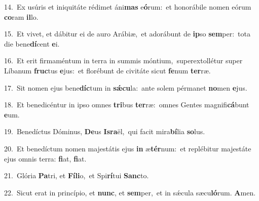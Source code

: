 {\numbfont\textcolor{\numbcolor}{14.}}~Ex usúris et iniquitáte rédimet áni\textbf{mas} e\-\textbf{ó}\-rum:~\star et honorábile nomen eórum \textbf{co}\-ram \textbf{il}\-lo.\par
{\numbfont\textcolor{\numbcolor}{15.}}~Et vivet, et dábitur ei de auro Arábiæ,~\dagger et adorábunt de \textbf{ip}\-so \textbf{sem}\-per:~\star tota die bene\-\textbf{dí}\-cent \textbf{e}\-i.\par
{\numbfont\textcolor{\numbcolor}{16.}}~Et erit firmaméntum in terra in summis móntium,~\dagger superextollétur super Líbanum \textbf{fruc}\-tus \textbf{e}\-jus:~\star et florébunt de civitáte sicut \textbf{fe}\-num \textbf{ter}\-ræ.\par
{\numbfont\textcolor{\numbcolor}{17.}}~Sit nomen ejus bene\-\textbf{díc}\-tum in \textbf{sǽ}\-\textbf{cu}la:~\star ante solem pérmanet \textbf{no}\-men \textbf{e}\-jus.\par
{\numbfont\textcolor{\numbcolor}{18.}}~Et benedicéntur in ipso omnes \textbf{tri}\-bus \textbf{ter}\-ræ:~\star omnes Gentes magnifi\-\textbf{cá}\-bunt \textbf{e}\-um.\par
{\numbfont\textcolor{\numbcolor}{19.}}~Benedíctus Dóminus, \textbf{De}\-us \textbf{Is}\-\textbf{ra}ël,~\star qui facit mira\-\textbf{bí}\-lia \textbf{so}\-lus.\par
{\numbfont\textcolor{\numbcolor}{20.}}~Et benedíctum nomen majestátis ejus \textbf{in} æ\-\textbf{tér}\-num:~\star et replébitur majestáte ejus omnis terra: \textbf{fi}\-at, \textbf{fi}\-at.\par
{\numbfont\textcolor{\numbcolor}{21.}}~Glória \textbf{Pa}\-tri, et \textbf{Fí}\-\textbf{li}o,~\star et Spi\-\textbf{rí}\-tui \textbf{Sanc}\-to.\par
{\numbfont\textcolor{\numbcolor}{22.}}~Sicut erat in princípio, et \textbf{nunc}\-, et \textbf{sem}\-per,~\star et in sǽcula sæcu\-\textbf{ló}\-rum. \textbf{A}\-men.\par
